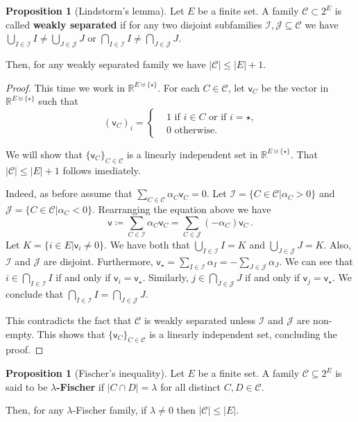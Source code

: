 \documentclass[12pt]{amsart}
\theoremstyle{definition}
\newtheorem{prop}[thm]{Proposition}
\newcommand{\R}{\mathbb{R}}
\newcommand{\CC}{\mathcal C}
\newcommand{\JJ}{\mathcal J}
\newcommand{\II}{\mathcal I}
\newcommand{\vv}{\mathsf{v}}
\begin{document}
\begin{prop}[Lindstorm's lemma]
Let $E$ be a finite set.
A family $\CC \subset 2^E $ is called \textbf{weakly separated} if for any two disjoint subfamilies $\II, \JJ \subseteq \CC$ we have $\bigcup_{I\in\II} I \neq \bigcup_{J\in\JJ} J$ or $\bigcap_{I\in\II} I \neq \bigcap_{J\in\JJ} J$.

Then, for any weakly separated family we have $|\CC| \leq |E| + 1$.
\end{prop}

\begin{proof}
This time we work in $\R^{E \uplus \{ \star \}}$.
For each $C \in \CC$, let $\vv_C$ be the vector in $\R^{E \uplus \{ \star \}}$ such that 
$$ (\vv_C)_i =\begin{cases*}
      & 1 \text{ if $i \in C$ or if $i = \star$,}\\
      & 0 \text{ otherwise.}
    \end{cases*} $$


We will show that $\{ \vv_C\}_{C\in \CC}$ is a linearly independent set in $\R^{E \uplus \{ \star \}}$.
That $|\CC| \leq |E|+1$ follows imediately.

Indeed, as before assume that $\sum_{C \in \CC} \alpha_C \vv_C = 0$.
Let $\II = \{C \in \CC | \alpha_C > 0\}$ and $\JJ = \{C \in \CC | \alpha_C < 0\}$.
Rearranging the equation above we have
$$\vv \coloneqq \sum_{C \in \II} \alpha_C \vv_C  = \sum_{C \in \JJ} (- \alpha_C) \vv_C\, .$$
Let $K = \{i \in E| \vv_i \neq 0\}$.
We have both that $\bigcup_{I\in\II} I = K$ and $\bigcup_{J\in\JJ} J = K$.
Also, $\II$ and $\JJ$ are disjoint.
Furthermore, $\vv_{\star } = \sum_{I \in \II} \alpha_I = - \sum_{J \in \JJ} \alpha_J$.
We can see that $i \in \bigcap_{I \in \II} I$ if and only if $\vv_i = \vv_{\star }$.
Similarly, $j \in \bigcap_{J \in \JJ} J$ if and only if $\vv_j = \vv_{\star }$.
We conclude that $\bigcap_{I \in \II} I = \bigcap_{J \in \JJ} J$.

This contradicts the fact that $\CC$ is weakly separated unless $\II$ and $\JJ$ are non-empty.
This shows that $ \{ \vv_C\}_{C\in \CC}$ is a linearly independent set, concluding the proof.
\end{proof}


\begin{prop}[Fischer's inequality]
Let $E$ be a finite set.
A family $\CC \subseteq 2^E$ is said to be $\lambda$\textbf{-Fischer} if $|C\cap D| = \lambda$ for all distinct $C, D \in \CC$.

Then, for any $\lambda$-Fischer family, if $\lambda \neq 0$ then $|\CC| \leq |E|$.
\end{prop}
\end{document}
